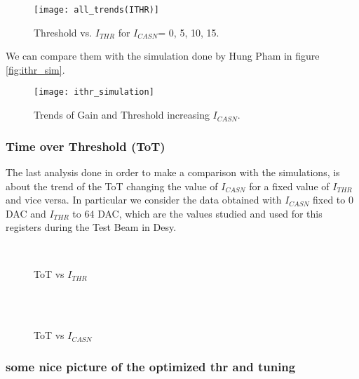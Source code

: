 \begin{figure}[h!]
\centering
\texttt{[image: all\_trends(ITHR)]}
\caption{Threshold vs. $I_{THR}$ for $I_{CASN}$= 0, 5, 10, 15.}
\label{fig:alltrends_ithr}
\end{figure}

We can compare them with the simulation done by Hung Pham in figure \vref{fig:ithr_sim}. 

\begin{figure}[h!]
\centering
\texttt{[image: ithr\_simulation]}
\caption{Trends of Gain and Threshold increasing $I_{CASN}$.}
\label{fig:ithr_sim}
\end{figure}



\subsubsection{Time over Threshold (ToT)}

The last analysis done in order to make a comparison with the simulations, is about the trend of the ToT changing the value of $I_{CASN}$ for a fixed value of $I_{THR}$ and vice versa. In particular we consider the data obtained with $I_{CASN}$ fixed to 0 DAC and $I_{THR}$ to 64 DAC, which are the values studied and used for this registers during the Test Beam in Desy.

\begin{figure}[h!]
\centering
{}\quad
{}\\
\caption{ToT vs $I_{THR}$}
\label{fig:tot_vs_ithr}
\end{figure}

\begin{figure}[h!]
\centering
{}\\%
{}\\
\caption{ToT vs $I_{CASN}$}
\label{fig:tot_vs_icasn}
\end{figure}


\subsubsection{some nice picture of the optimized thr and tuning}


